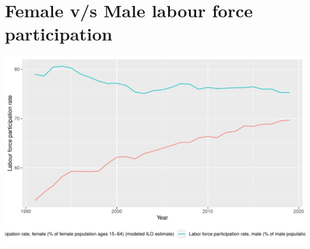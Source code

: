 \documentclass[11pt,a4paper,]{article}
\newenvironment{Shaded}{\begin{snugshade}}{\end{snugshade}}
\newcommand{\DataTypeTok}[1]{\textcolor[rgb]{0.13,0.29,0.53}{#1}}
\newcommand{\DecValTok}[1]{\textcolor[rgb]{0.00,0.00,0.81}{#1}}
\newcommand{\KeywordTok}[1]{\textcolor[rgb]{0.13,0.29,0.53}{\textbf{#1}}}
\newcommand{\NormalTok}[1]{#1}
\newcommand{\OperatorTok}[1]{\textcolor[rgb]{0.81,0.36,0.00}{\textbf{#1}}}
\newcommand{\StringTok}[1]{\textcolor[rgb]{0.31,0.60,0.02}{#1}}
\let\origfigure\figure
\let\endorigfigure\endfigure
\renewenvironment{figure}[1][2] {
    \expandafter\origfigure\expandafter[H]
} {
    \endorigfigure
}%
\begin{document}
\hypertarget{female-vs-male-labour-force-participation}{%
\section{Female v/s Male labour force participation}\label{female-vs-male-labour-force-participation}}

\begin{Shaded}
\end{Shaded}

\begin{figure}
\centering
\includegraphics{report_files/figure-latex/graph3-1.pdf}
\caption{\label{fig:graph3}Female v/s Male labour force participation}
\end{figure}
\end{document}
